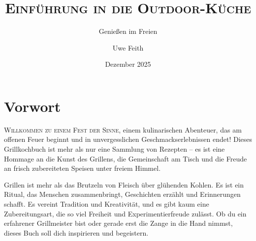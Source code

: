 \documentclass[pdftext, bcor=7mm, ngerman]{scrbook}
\begin{document}



\begin{titlepage}
	\subject{Kochen mit kurzen Hosen}
	\title{\Huge \textsc{Einführung in die Outdoor-Küche}}
	\subtitle{Genießen im Freien}
	\author{Uwe Feith}
	\date{Dezember 2025}
\end{titlepage}
\dedication{Für meine Familie und lieben Freunde, \\
die mutig und selbstlos die neusten Kreationen kosten\\}

\maketitle



\frontmatter




\chapter{Vorwort}
\lettrine[lines=3]{W}{illkommen zu einem Fest der Sinne,} einem kulinarischen Abenteuer, das am offenen Feuer beginnt und in 
unvergesslichen Geschmackserlebnissen endet! Dieses Grillkochbuch ist mehr als nur eine Sammlung von Rezepten – es ist eine 
Hommage an die Kunst des Grillens, die Gemeinschaft am Tisch und die Freude an frisch zubereiteten Speisen unter freiem Himmel.

Grillen ist mehr als das Brutzeln von Fleisch über glühenden Kohlen. Es ist ein Ritual, das Menschen zusammenbringt, Geschichten 
erzählt und Erinnerungen schafft. Es vereint Tradition und Kreativität, und es gibt kaum eine Zubereitungsart, die so viel Freiheit und 
Experimentierfreude zulässt. Ob du ein erfahrener Grillmeister bist oder gerade erst die Zange in die Hand nimmst, dieses Buch soll dich 
inspirieren und begeistern.
\end{document}
